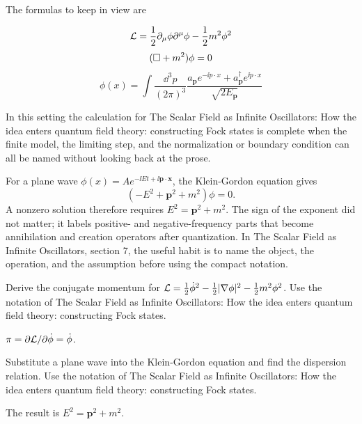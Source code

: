 The formulas to keep in view are

\[
  \mathcal L=\frac12\partial_\mu\phi\partial^\mu\phi-\frac12m^2\phi^2
\]
\[
  (\Box+m^2)\phi=0
\]
\[
  \phi(x)=\int\frac{\dd^3p}{(2\pi)^3}\frac{a_{\bm p}e^{-\ii p\cdot x}+a_{\bm p}^\dagger e^{\ii p\cdot x}}{\sqrt{2E_{\bm p}}}
\]

In this setting the calculation for The Scalar Field as Infinite Oscillators: How the idea enters quantum field theory: constructing Fock states is complete when the finite model, the limiting step, and the normalization or boundary condition can all be named without looking back at the prose.




\begin{example}
For a plane wave \(\phi(x)=Ae^{-\ii Et+\ii\bm p\cdot\bm x}\), the Klein-Gordon equation gives
\[
  (-E^2+\bm p^2+m^2)\phi=0.
\]
A nonzero solution therefore requires \(E^2=\bm p^2+m^2\).  The sign of the exponent did not matter; it labels positive- and negative-frequency parts that become annihilation and creation operators after quantization.  In The Scalar Field as Infinite Oscillators, section 7, the useful habit is to name the object, the operation, and the assumption before using the compact notation.
\end{example}



\begin{exercise}
Derive the conjugate momentum for \(\mathcal L=\frac12\dot\phi^2-\frac12|\nabla\phi|^2-\frac12m^2\phi^2\).  Use the notation of The Scalar Field as Infinite Oscillators: How the idea enters quantum field theory: constructing Fock states.
\begin{answer}
\(\pi=\partial\mathcal L/\partial\dot\phi=\dot\phi\).
\end{answer}
\end{exercise}

\begin{exercise}
Substitute a plane wave into the Klein-Gordon equation and find the dispersion relation.  Use the notation of The Scalar Field as Infinite Oscillators: How the idea enters quantum field theory: constructing Fock states.
\begin{answer}
The result is \(E^2=\bm p^2+m^2\).
\end{answer}
\end{exercise}



